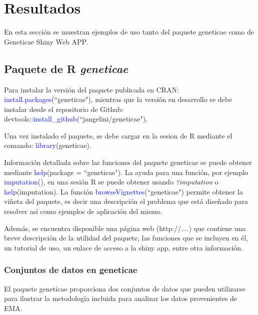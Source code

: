 

\chapter{Resultados}

En esta sección se muestran ejemplos de uso tanto del paquete geneticae como de Geneticae Shiny Web APP. 

\section{Paquete de R \emph{geneticae}}

Para instalar la versión del paquete publicada en CRAN: \textcolor{blue}{install.packages}(``geneticae"), mientras que la versión en desarrollo se debe instalar desde el repositorio de Github: devtools::\textcolor{blue}{install\_github}(``jangelini/geneticae"). 

Una vez instalado el paquete, se debe cargar en la sesion de R mediante el comando: \textcolor{blue}{library}(geneticae). 

Información detallada sobre las funciones del paquete geneticae se puede obtener mediante \textcolor{blue}{help}(package = ``geneticae"). La ayuda para una función, por ejemplo \textcolor{blue}{imputation}(), en una sesión R se puede obtener usando \emph{?imputation} o \textcolor{blue}{help}(imputation). La función \textcolor{blue}{browseVignettes}(``geneticae") permite obtener la viñeta del paquete, es decir una descripción el problema que está diseñado para resolver así como ejemplos de aplicación del mismo. 

Además, se encuentra disponible una página web (http://....) que contiene una breve descripción de la utilidad del paquete, las funciones que se incluyen en él, un tutorial de uso, un enlace de acceso a la shiny app, entre otra información.


\subsection{Conjuntos de datos en geneticae}
\label{subsec:datosejemplos}
El paquete geneticae proporciona dos conjuntos de datos que pueden utilizarse para ilustrar la metodología incluida para analizar los datos provenientes de EMA. 

